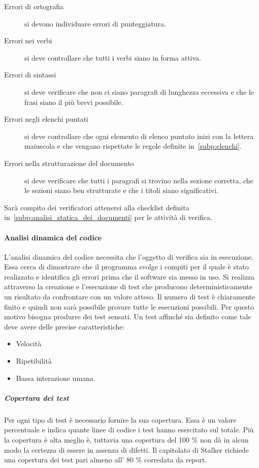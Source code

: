 \documentclass[../norme-di-progetto.tex]{subfiles}
\begin{document}
\begin{description}
  \item [Errori di ortografia] si devono individuare errori di punteggiatura.
  \item [Errori nei verbi] si deve controllare che tutti i verbi siano in forma attiva.
  \item [Errori di sintassi] si deve verificare che non ci siano paragrafi di lunghezza eccessiva e che le frasi siano il più brevi possibile.
  \item [Errori negli elenchi puntati] si deve controllare che ogni elemento di elenco puntato inizi con la lettera maiuscola e che vengano rispettate le regole definite in~\ref{subp:elenchi}.
  \item [Errori nella strutturazione del documento] si deve verificare che tutti i paragrafi si trovino nella sezione corretta, che le sezioni siano ben strutturate e che i titoli siano significativi.
\end{description}

Sarà compito dei verificatori attenersi alla checklist definita in~\ref{subp:analisi_statica_dei_documenti} per le attività di verifica.

\paragraph{Analisi dinamica del codice}%
\label{par:analisi_dinamica_del_codice}
L'analisi dinamica del codice necessita che l'oggetto di verifica sia in esecuzione.
Essa cerca di dimostrare che il programma svolge i compiti per il quale è stato realizzato e identifica gli errori prima che il software sia messo in uso.
Si realizza attraverso la creazione e l'esecuzione di test che producono deterministicamente un risultato da confrontare con un valore atteso.
Il numero di test è chiaramente finito e quindi non sarà possibile provare tutte le esecuzioni possibili.
Per questo motivo bisogna produrre dei test sensati.
Un test affinché sia definito come tale deve avere delle precise caratteristiche:

\begin{itemize}
  \item Velocità
  \item Ripetibilità
  \item Bassa interazione umana.
\end{itemize}

\subparagraph{Copertura dei test}%
\label{subp:copertura_dei_test}
Per ogni tipo di test è necessario fornire la sua copertura.
Essa è un valore percentuale e indica quante linee di codice i test hanno esercitato sul totale.
Più la copertura è alta meglio è, tuttavia una copertura del 100 \% non dà in alcun modo la certezza di essere in assenza di difetti.
Il capitolato di Stalker richiede una copertura dei test pari almeno all' 80 \% corredata da report.
\end{document}
